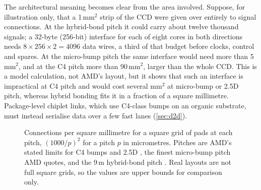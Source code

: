 The architectural meaning becomes clear from the area involved. Suppose, for illustration only, that a 1\,mm$^2$ strip of the CCD were given over entirely to signal connections. At the hybrid-bond pitch it could carry about twelve thousand signals; a 32-byte (256-bit) interface for each of eight cores in both directions needs $8 \times 256 \times 2 = 4096$ data wires, a third of that budget before clocks, control and spares. At the micro-bump pitch the same interface would need more than 5\,mm$^2$, and at the C4 pitch more than 90\,mm$^2$, larger than the whole CCD. This is a model calculation, not AMD's layout, but it shows that such an interface is impractical at C4 pitch and would cost several mm$^2$ at micro-bump or 2.5D pitch, whereas hybrid bonding fits it in a fraction of a square millimetre. Package-level chiplet links, which use C4-class bumps on an organic substrate, must instead serialise data over a few fast lanes (\cref{sec:d2d}).

\begin{figure}[htbp]
\centering
{}
\caption[Connections per mm$^2$ at each interconnect pitch]{Connections per square millimetre for a square grid of pads at each pitch, $(1000/p)^2$ for a pitch $p$ in micrometres. Pitches are AMD's stated limits for C4 bumps and 2.5D \cite[slide~13]{lambertHeterogenousIntegrationHigh2025}, the finest micro-bump pitch AMD quotes, and the 9\,\textmu m hybrid-bond pitch \cite{swaminathanAdvancedPackagingEnabling2021}. Real layouts are not full square grids, so the values are upper bounds for comparison only.}
\label{fig:interconnect-density}
\end{figure}

